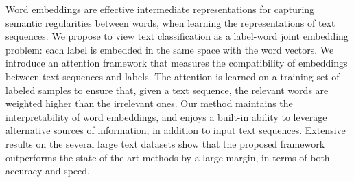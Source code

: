 Word embeddings are effective intermediate representations for capturing semantic regularities between words, when learning the representations of text sequences. We propose to view text classification as a label-word joint embedding problem: each label is embedded in the same space with the word vectors. We introduce an attention framework that measures the compatibility of embeddings between text sequences and labels. The attention is learned on a training set of labeled samples to ensure that, given a text sequence, the relevant words are weighted higher than the irrelevant ones. Our method maintains the interpretability of word embeddings, and enjoys a built-in ability to leverage alternative sources of information, in addition to input text sequences.  Extensive results on the several large text datasets show that the proposed framework outperforms the state-of-the-art methods by a large margin, in terms of both accuracy and speed.
